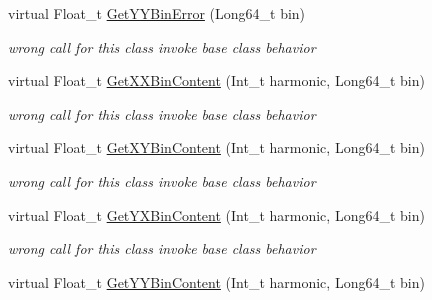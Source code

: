 \begin{DoxyCompactItemize}
virtual Float\+\_\+t \mbox{\hyperlink{classQn_1_1CorrectionProfile3DCorrelations_a02c551ac645a7b5a3f2413a7ccb8985a}{Get\+Y\+Y\+Bin\+Error}} (Long64\+\_\+t bin)
\begin{DoxyCompactList}\small\item\em wrong call for this class invoke base class behavior \end{DoxyCompactList}\item 
\mbox{\label{classQn_1_1CorrectionProfile3DCorrelations_a36e3cae66cf3f957b5e92a78b45aea6a}} 
virtual Float\+\_\+t \mbox{\hyperlink{classQn_1_1CorrectionProfile3DCorrelations_a36e3cae66cf3f957b5e92a78b45aea6a}{Get\+X\+X\+Bin\+Content}} (Int\+\_\+t harmonic, Long64\+\_\+t bin)
\begin{DoxyCompactList}\small\item\em wrong call for this class invoke base class behavior \end{DoxyCompactList}\item 
\mbox{\label{classQn_1_1CorrectionProfile3DCorrelations_a4471deccdf29c330cdbbbbb47d949d08}} 
virtual Float\+\_\+t \mbox{\hyperlink{classQn_1_1CorrectionProfile3DCorrelations_a4471deccdf29c330cdbbbbb47d949d08}{Get\+X\+Y\+Bin\+Content}} (Int\+\_\+t harmonic, Long64\+\_\+t bin)
\begin{DoxyCompactList}\small\item\em wrong call for this class invoke base class behavior \end{DoxyCompactList}\item 
\mbox{\label{classQn_1_1CorrectionProfile3DCorrelations_a27127ed9f52b6b4b7ec2df59f88c457f}} 
virtual Float\+\_\+t \mbox{\hyperlink{classQn_1_1CorrectionProfile3DCorrelations_a27127ed9f52b6b4b7ec2df59f88c457f}{Get\+Y\+X\+Bin\+Content}} (Int\+\_\+t harmonic, Long64\+\_\+t bin)
\begin{DoxyCompactList}\small\item\em wrong call for this class invoke base class behavior \end{DoxyCompactList}\item 
\mbox{\label{classQn_1_1CorrectionProfile3DCorrelations_a64bac99b0b417241e68ba9d133d07ef4}} 
virtual Float\+\_\+t \mbox{\hyperlink{classQn_1_1CorrectionProfile3DCorrelations_a64bac99b0b417241e68ba9d133d07ef4}{Get\+Y\+Y\+Bin\+Content}} (Int\+\_\+t harmonic, Long64\+\_\+t bin)

\end{DoxyCompactItemize}
